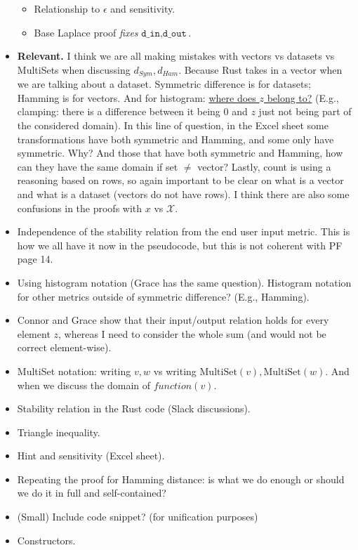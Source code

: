 \documentclass[11pt,a4paper]{article}
\theoremstyle{definition}
\newcommand{\MultiSet}{\mathrm{MultiSet}}
\newcommand{\din}{\texttt{d\_in}}
\newcommand{\dout}{\texttt{d\_out}}
\newcommand{\X}{\mathcal{X}}
\begin{document}
\begin{itemize}
\begin{itemize}
        \item Relationship to $\epsilon$ and sensitivity.
        \item Base Laplace proof \textit{fixes} $\din, \dout$. %
    \end{itemize}
    \item \textbf{Relevant.} I think we are all making mistakes with vectors vs datasets vs MultiSets when discussing $d_{Sym}, d_{Ham}$. Because Rust takes in a vector when we are talking about a dataset. Symmetric difference is for datasets; Hamming is for vectors. And for histogram: \underline{where does $z$ belong to?} (E.g., clamping: there is a difference between it being 0 and $z$ just not being part of the considered domain). In this line of question, in the Excel sheet some transformations have both symmetric and Hamming, and some only have symmetric. Why? And those that have both symmetric and Hamming, how can they have the same domain if set $\neq$ vector? Lastly, count is using a reasoning based on rows, so again important to be clear on what is a vector and what is a dataset (vectors do not have rows). I think there are also some confusions in the proofs with $x$ vs $\X$.
    \item Independence of the stability relation from the end user input metric. This is how we all have it now in the pseudocode, but this is not coherent with PF page 14.
    \item Using histogram notation (Grace has the same question). Histogram notation for other metrics outside of symmetric difference? (E.g., Hamming).
    \item Connor and Grace show that their input/output relation holds for every element $z$, whereas I need to consider the whole sum (and would not be correct element-wise).
    \item MultiSet notation: writing $v, w$ vs writing $\MultiSet(v), \MultiSet(w)$. And when we discuss the domain of $function(v)$.
    \item Stability relation in the Rust code (Slack discussions).
    \item Triangle inequality.
    \item Hint and sensitivity (Excel sheet).
    \item Repeating the proof for Hamming distance: is what we do enough or should we do it in full and self-contained?
    \item (Small) Include code snippet? (for unification purposes)
    \item Constructors.
\end{itemize}
\end{document}
